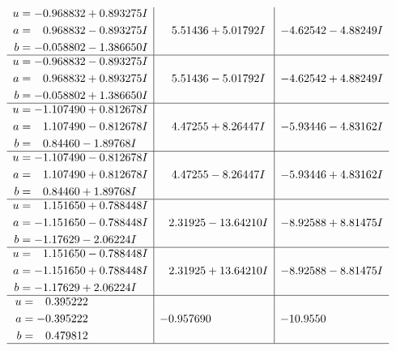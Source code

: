 \documentclass[1p]{elsarticle_modified}
\theoremstyle{definition}
\begin{document}
$$\begin{array}{c|c|c}
\begin{aligned}
u &= -0.968832 + 0.893275 I \\
a &= \phantom{-}0.968832 - 0.893275 I \\
b &= -0.058802 - 1.386650 I\end{aligned}
 & \phantom{-}5.51436 + 5.01792 I & -4.62542 - 4.88249 I \\ \hline\begin{aligned}
u &= -0.968832 - 0.893275 I \\
a &= \phantom{-}0.968832 + 0.893275 I \\
b &= -0.058802 + 1.386650 I\end{aligned}
 & \phantom{-}5.51436 - 5.01792 I & -4.62542 + 4.88249 I \\ \hline\begin{aligned}
u &= -1.107490 + 0.812678 I \\
a &= \phantom{-}1.107490 - 0.812678 I \\
b &= \phantom{-}0.84460 - 1.89768 I\end{aligned}
 & \phantom{-}4.47255 + 8.26447 I & -5.93446 - 4.83162 I \\ \hline\begin{aligned}
u &= -1.107490 - 0.812678 I \\
a &= \phantom{-}1.107490 + 0.812678 I \\
b &= \phantom{-}0.84460 + 1.89768 I\end{aligned}
 & \phantom{-}4.47255 - 8.26447 I & -5.93446 + 4.83162 I \\ \hline\begin{aligned}
u &= \phantom{-}1.151650 + 0.788448 I \\
a &= -1.151650 - 0.788448 I \\
b &= -1.17629 - 2.06224 I\end{aligned}
 & \phantom{-}2.31925 - 13.64210 I & -8.92588 + 8.81475 I \\ \hline\begin{aligned}
u &= \phantom{-}1.151650 - 0.788448 I \\
a &= -1.151650 + 0.788448 I \\
b &= -1.17629 + 2.06224 I\end{aligned}
 & \phantom{-}2.31925 + 13.64210 I & -8.92588 - 8.81475 I \\ \hline\begin{aligned}
u &= \phantom{-}0.395222\phantom{ +0.000000I} \\
a &= -0.395222\phantom{ +0.000000I} \\
b &= \phantom{-}0.479812\phantom{ +0.000000I}\end{aligned}
 & -0.957690\phantom{ +0.000000I} & -10.9550\phantom{ +0.000000I}\\
 \hline 
 \end{array}$$\newpage\newpage\renewcommand{\arraystretch}{1}
\end{document}
